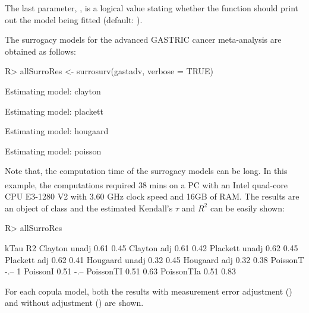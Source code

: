 \documentclass[article,shortnames, nojss]{jss}\usepackage[]{graphicx}\usepackage[]{color}
\begin{document}
  The last parameter, , is a logical value
  stating whether the function should print out the model being fitted
  (default: ).
  
  
  The surrogacy models for the advanced GASTRIC cancer meta-analysis
  are obtained as follows:
\begin{Schunk}
\begin{Sinput}
R> allSurroRes <-  surrosurv(gastadv, verbose = TRUE)
\end{Sinput}
\begin{Soutput}
Estimating model: clayton
\end{Soutput}
\begin{Soutput}
Estimating model: plackett
\end{Soutput}
\begin{Soutput}
Estimating model: hougaard
\end{Soutput}
\begin{Soutput}
Estimating model: poisson
\end{Soutput}
\end{Schunk}
Note that, the computation time of the surrogacy models can be long.
In this example, the computations required
  38
  mins
  on a PC with an Intel\textsuperscript{\textregistered} quad-core CPU E3-1280 V2
  with 3.60 GHz clock speed and 16GB of RAM.
The results are an object of class 
  and the estimated Kendall's $\tau$ and $R^2$ can be easily shown:
\begin{Schunk}
\begin{Sinput}
R>   allSurroRes
\end{Sinput}
\begin{Soutput}
               kTau R2  
Clayton unadj  0.61 0.45
Clayton adj    0.61 0.42
Plackett unadj 0.62 0.45
Plackett adj   0.62 0.41
Hougaard unadj 0.32 0.45
Hougaard adj   0.32 0.38
PoissonT       -.-- 1   
PoissonI       0.51 -.--
PoissonTI      0.51 0.63
PoissonTIa     0.51 0.83
\end{Soutput}
\end{Schunk}
For each copula model,
  both the results with measurement error adjustment ()
  and without adjustment () are shown.
\end{document}
